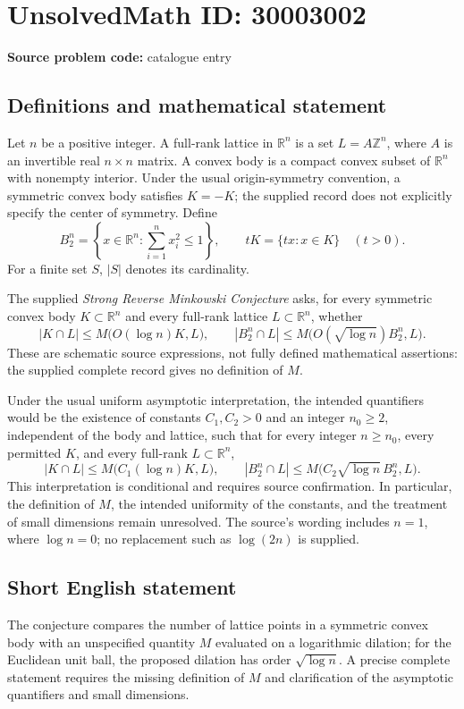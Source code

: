 \documentclass[11pt]{article}
\newcommand{\Z}{\mathbb{Z}}
\newcommand{\R}{\mathbb{R}}
\begin{document}
\section*{UnsolvedMath ID: 30003002}
\textbf{Source problem code:} catalogue entry
\subsection{Definitions and mathematical statement}
Let \(n\) be a positive integer. A full-rank lattice in \(\R^n\) is a set \(L=A\Z^n\), where \(A\) is an invertible real \(n\times n\) matrix. A convex body is a compact convex subset of \(\R^n\) with nonempty interior. Under the usual origin-symmetry convention, a symmetric convex body satisfies \(K=-K\); the supplied record does not explicitly specify the center of symmetry. Define
\[
B_2^n=\left\{x\in\R^n:\sum_{i=1}^n x_i^2\leq 1\right\},\qquad tK=\{tx:x\in K\}\quad(t>0).
\]
For a finite set \(S\), \(|S|\) denotes its cardinality.

The supplied \emph{Strong Reverse Minkowski Conjecture} asks, for every symmetric convex body \(K\subset\R^n\) and every full-rank lattice \(L\subset\R^n\), whether
\[
|K\cap L|\leq M\bigl(O(\log n)K,L\bigr),
\qquad
|B_2^n\cap L|\leq M\bigl(O(\sqrt{\log n})B_2^n,L\bigr).
\]
These are schematic source expressions, not fully defined mathematical assertions: the supplied complete record gives no definition of \(M\).

Under the usual uniform asymptotic interpretation, the intended quantifiers would be the existence of constants \(C_1,C_2>0\) and an integer \(n_0\geq2\), independent of the body and lattice, such that for every integer \(n\geq n_0\), every permitted \(K\), and every full-rank \(L\subset\R^n\),
\[
|K\cap L|\leq M\bigl(C_1(\log n)K,L\bigr),
\qquad
|B_2^n\cap L|\leq M\bigl(C_2\sqrt{\log n}\,B_2^n,L\bigr).
\]
This interpretation is conditional and requires source confirmation. In particular, the definition of \(M\), the intended uniformity of the constants, and the treatment of small dimensions remain unresolved. The source's wording includes \(n=1\), where \(\log n=0\); no replacement such as \(\log(2n)\) is supplied.
\subsection{Short English statement}
The conjecture compares the number of lattice points in a symmetric convex body with an unspecified quantity \(M\) evaluated on a logarithmic dilation; for the Euclidean unit ball, the proposed dilation has order \(\sqrt{\log n}\). A precise complete statement requires the missing definition of \(M\) and clarification of the asymptotic quantifiers and small dimensions.
\end{document}
